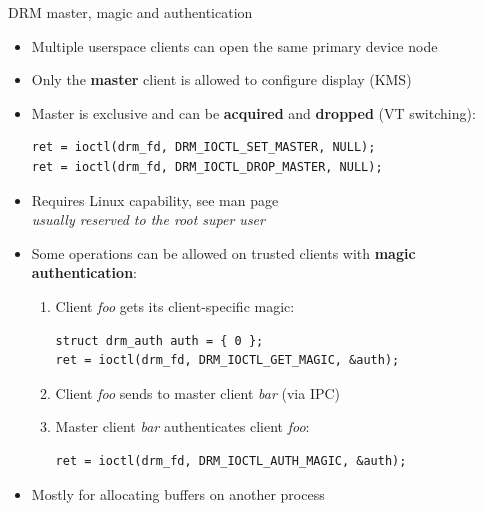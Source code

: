 \begin{frame}[fragile]{DRM master, magic and authentication}
  \begin{itemize}
  \item Multiple userspace clients can open the same primary device node
  \item Only the \textbf{master} client is allowed to configure display (KMS)
  \item Master is exclusive and can be \textbf{acquired} and \textbf{dropped} (VT switching):
  \begin{verbatim}
ret = ioctl(drm_fd, DRM_IOCTL_SET_MASTER, NULL);
ret = ioctl(drm_fd, DRM_IOCTL_DROP_MASTER, NULL);
  \end{verbatim}
  \item Requires  Linux capability, see  man page\\
    \textit{usually reserved to the root super user}
  \item Some operations can be allowed on trusted clients with \textbf{magic authentication}:
  \begin{enumerate}
  \item Client \textit{foo} gets its client-specific magic:
  \begin{verbatim}
struct drm_auth auth = { 0 };
ret = ioctl(drm_fd, DRM_IOCTL_GET_MAGIC, &auth);
  \end{verbatim}
  \item Client \textit{foo} sends  to master client \textit{bar} (via IPC)
  \item Master client \textit{bar} authenticates client \textit{foo}:
  \begin{verbatim}
ret = ioctl(drm_fd, DRM_IOCTL_AUTH_MAGIC, &auth);
  \end{verbatim}
  \end{enumerate}
  \item Mostly for allocating buffers on another process
  \end{itemize}
\end{frame}


